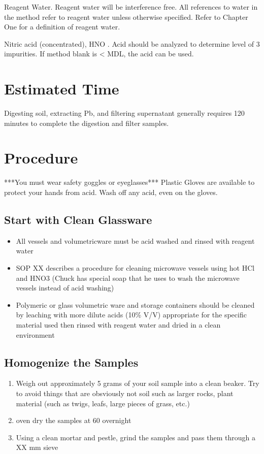 \documentclass[12pt]{../SOP3_alpha}\usepackage[]{graphicx}\usepackage[]{color}
\begin{document}
\NP Reagent Water. Reagent water will be interference free. All references to water in
the method refer to reagent water unless otherwise specified. Refer to Chapter One for a definition
of reagent water.

\NP Nitric acid (concentrated), HNO . Acid should be analyzed to determine level of 3
impurities. If method blank is < MDL, the acid can be used. 


\section{Estimated Time}

\NP Digesting soil, extracting Pb, and filtering supernatant  generally requires 120 minutes to complete the digestion and filter samples.


\section{Procedure}


***You must wear safety goggles or eyeglasses***
Plastic Gloves are available to protect your hands from acid. Wash off any acid, even on the gloves.

\subsection{Start with Clean Glassware}
  \begin{itemize}
  \item All vessels and volumetricware must be acid washed and rinsed with reagent water
  \item SOP XX describes a procedure for cleaning microwave vessels using hot HCl and HNO3 (Chuck has special soap that he uses to wash the microwave vessels instead of acid washing)
  \item Polymeric or glass volumetric ware and storage containers should be cleaned by leaching with more dilute acids (10\% V/V) appropriate for the specific material used then rinsed with reagent water and dried in a clean environment
  \end{itemize}
\subsection{Homogenize the Samples}
  \begin{enumerate}
  \item Weigh out approximately 5 grams of your soil sample into a clean beaker. Try to avoid things that are obsviously not soil such as larger rocks, plant material (such as twigs, leafs, large pieces of grass, etc.)
  \item oven dry the samples at 60 \celsius overnight
  \item Using a clean mortar and pestle, grind the samples and pass them through a XX mm sieve %
  \end{enumerate}
\end{document}

